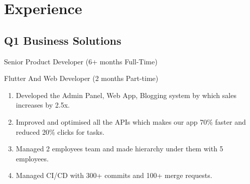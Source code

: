 \documentclass[]{deedy-resume-openfont}
\begin{document}
\begin{minipage}[t]{0.55\textwidth} 


\section{Experience}
\subsection{Q1 Business Solutions}
\sectionsep
\begin{tightemize}
\item Senior Product Developer (6+ months Full-Time)
\end{tightemize}
\hspace{\topsep}

\begin{tightemize}
\item Flutter And Web Developer (2 months Part-time)
\end{tightemize}
\hspace{\topsep}
\begin{enumerate}
\item Developed the Admin Panel, Web App, Blogging system by which sales increases by 2.5x.
\item Improved and optimised all the APIs which makes our app 70\% faster and reduced 20\% clicks for tasks.
\item Managed 2 employees team and made hierarchy under them with 5 employees.
\item Managed CI/CD with 300+ commits and 100+ merge requests.
\end{enumerate}
\sectionsep






\end{minipage}
\end{document}
